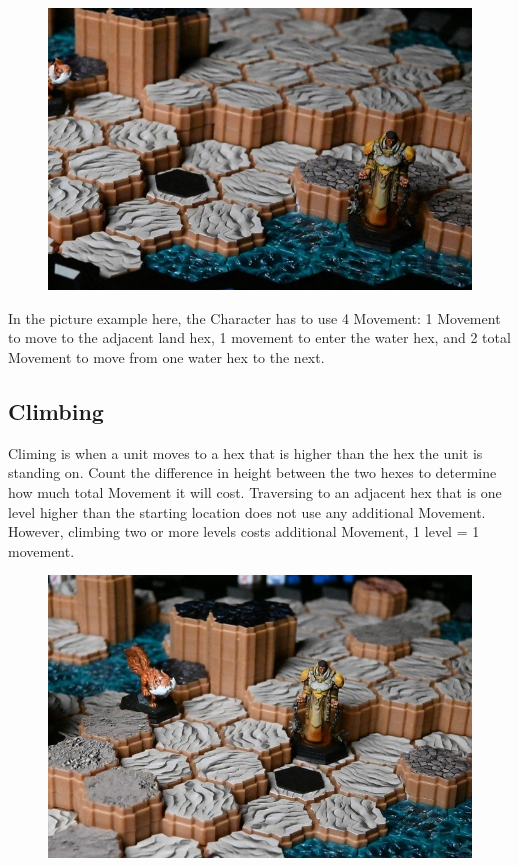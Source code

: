 \documentclass[../main.tex]{subfiles}
\begin{document}
\begin{figure}[h]
    \centering
    \includegraphics[width=1\linewidth]{chapters//Movement/TimeStrikeWaterMovement2.jpg}   
\end{figure}
In the picture example here, the Character has to use 4 Movement: 1 Movement to move to the adjacent land hex, 1 movement to enter the water hex, and 2 total Movement to move from one water hex to the next. 

\clearpage
\subsection{Climbing}
Climing is when a unit moves to a hex that is higher than the hex the unit is standing on. Count the difference in height between the two hexes to determine how much total Movement it will cost. Traversing to an adjacent hex that is one level higher than the starting location does not use any additional Movement. However, climbing two or more levels costs additional Movement, 1 level = 1 movement.

\begin{figure}[h]
    \centering
    \includegraphics[width=0.75\linewidth]{chapters//Movement/TimeStrikeClimbing1.jpg}
\end{figure}
\end{document}
